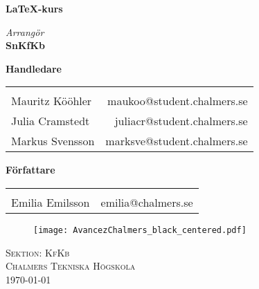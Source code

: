 \begin{center}

\Huge \textbf {\LaTeX-kurs
}\\[.2in]
        \Large
        

       \vspace{.25in}
       
       \small \emph{Arrangör}\\
       {\bf SnKfKb }\\[.2in]
       
       \vspace{1in}



\large \textbf{Handledare}  \normalsize \\
\begin{table}[h]
\centering
\begin{tabular}{lr}\hline \\
Mauritz Kööhler & maukoo@student.chalmers.se \\
Julia Cramstedt & juliacr@student.chalmers.se  \\
Markus Svensson & marksve@student.chalmers.se \\

\end{tabular}
\end{table}

\textbf{Författare} \normalsize \\
 
\begin{table}[h]
    \centering
    \begin{tabular}{lr}\hline \\
       Emilia Emilsson  & emilia@chalmers.se \\
    \end{tabular}
    \label{tab:my_label}
\end{table}



\vspace{1in}
\begin{figure}[h]
    \centering
    \texttt{[image: AvancezChalmers\_black\_centered.pdf]}
\end{figure}
\vspace{.2in}

\centering{}
{\selectfont \Large{\textsc{Sektion: KfKb}}}\\
\normalsize
\textsc{Chalmers Tekniska Högskola}\\
\vspace{.2cm}
\today

\end{center}